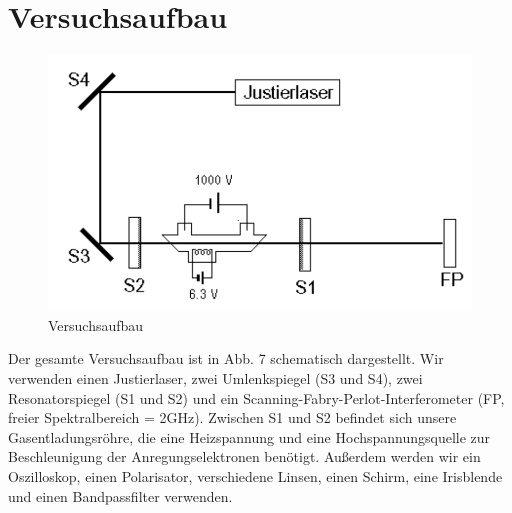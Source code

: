 \section{Versuchsaufbau}

\begin{figure}[here]
\centering
\includegraphics[scale=0.5]{img/HNL1}
\caption{Versuchsaufbau}
\begin{center}
\end{center}
\end{figure}

Der gesamte Versuchsaufbau ist in Abb. 7 schematisch dargestellt. Wir verwenden einen Justierlaser, zwei Umlenkspiegel (S3 und S4), zwei Resonatorspiegel (S1 und S2) und ein Scanning-Fabry-Perlot-Interferometer (FP, freier Spektralbereich = 2GHz). Zwischen S1 und S2 befindet sich unsere Gasentladungsröhre, die eine Heizspannung und eine Hochspannungsquelle zur Beschleunigung der Anregungselektronen benötigt. Außerdem werden wir ein Oszilloskop, einen Polarisator, verschiedene Linsen, einen Schirm, eine Irisblende und einen Bandpassfilter verwenden.